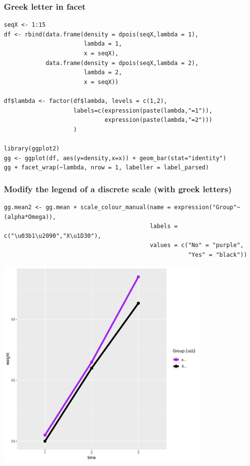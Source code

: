 \documentclass{article}
\begin{document}
\subsubsection{Greek letter in facet}
\label{sec:org53e51ac}
\lstset{language=r,label= ,caption= ,captionpos=b,numbers=none}
\begin{lstlisting}
seqX <- 1:15
df <- rbind(data.frame(density = dpois(seqX,lambda = 1),
                       lambda = 1,
                       x = seqX),
            data.frame(density = dpois(seqX,lambda = 2),
                       lambda = 2,
                       x = seqX))

df$lambda <- factor(df$lambda, levels = c(1,2),
                    labels=c(expression(paste(lambda,"=1")),
                             expression(paste(lambda,"=2")))
                    )

library(ggplot2)
gg <- ggplot(df, aes(y=density,x=x)) + geom_bar(stat="identity")
gg + facet_wrap(~lambda, nrow = 1, labeller = label_parsed)

\end{lstlisting}

\subsubsection{Modify the legend of a discrete scale (with greek letters)}
\label{sec:orgec7b318}

\lstset{language=r,label= ,caption= ,captionpos=b,numbers=none}
\begin{lstlisting}
gg.mean2 <- gg.mean + scale_colour_manual(name = expression("Group"~(alpha*Omega)),
                                          labels = c("\u03b1\u2090","X\u1D30"),
                                          values = c("No" = "purple", 
                                                     "Yes" = "black"))
\end{lstlisting}

\begin{center}
\includegraphics[width=0.8\textwidth]{./figures/fig-meanTime2.pdf}
\end{center}
\end{document}
